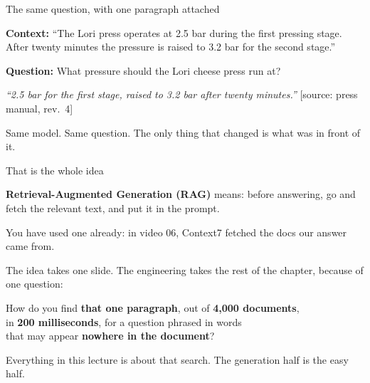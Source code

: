 \documentclass[aspectratio=169]{beamer}
\newcommand{\keybox}[1]{%
  \begin{tcolorbox}[colback=armblue!8, colframe=armblue, boxrule=0.6pt, arc=2pt]
  #1
  \end{tcolorbox}}
\begin{document}
\begin{frame}{The same question, with one paragraph attached}
  \vspace{0.3em}
  \begin{center}
  \begin{tcolorbox}[colback=armblue!8, colframe=armblue, boxrule=0.6pt, arc=2pt, width=0.9\textwidth]
    \small
    \textbf{Context:} ``The Lori press operates at 2.5 bar during the first pressing stage.
    After twenty minutes the pressure is raised to 3.2 bar for the second stage.''

    \vspace{0.5em}
    \textbf{Question:} What pressure should the Lori cheese press run at?
  \end{tcolorbox}
  \end{center}

  \vspace{0.3em}
  \begin{center}
  \begin{tcolorbox}[colback=paramgreen!8, colframe=paramgreen, boxrule=0.6pt, arc=2pt, width=0.9\textwidth]
    \small
    \textit{``2.5 bar for the first stage, raised to 3.2 bar after twenty minutes.''}
    \hfill {\scriptsize [source: press manual, rev.~4]}
  \end{tcolorbox}
  \end{center}

  \vspace{0.6em}
  Same model. Same question. The only thing that changed is what was in front of it.
\end{frame}

\begin{frame}{That is the whole idea}
  \vspace{0.6em}
  \keybox{\textbf{Retrieval-Augmented Generation (RAG)} means: before answering, go and
  fetch the relevant text, and put it in the prompt.}

  \vspace{0.4em}
  {\small You have used one already: in video 06, Context7 fetched the docs our answer came from.}

  \vspace{0.8em}
  The idea takes one slide. The engineering takes the rest of the chapter, because of one
  question:

  \vspace{0.8em}
  \begin{center}
    {\large How do you find \textbf{that one paragraph}, out of \textbf{4{,}000 documents},}\\[0.3em]
    {\large in \textbf{200 milliseconds}, for a question phrased in words}\\[0.3em]
    {\large that may appear \textbf{nowhere in the document}?}
  \end{center}

  \vspace{0.5em}
  \begin{center}
  {\small\color{gray}Everything in this lecture is about that search. The generation half
  is the easy half.}
  \end{center}
\end{frame}
\end{document}
